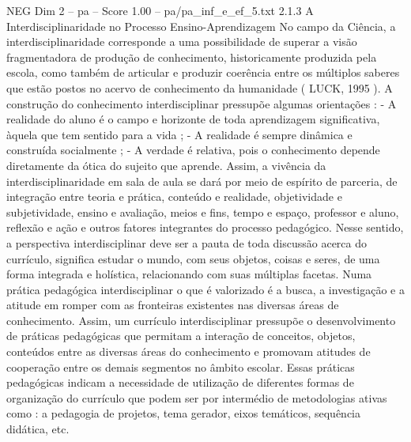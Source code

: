 \begin{textsample}{NEG Dim 2 – pa – Score 1.00 – pa/pa\_inf\_e\_ef\_5.txt}  \label{ex:f2_neg_223}
2.1.3 A Interdisciplinaridade no Processo Ensino-Aprendizagem No campo da Ciência, a interdisciplinaridade corresponde a uma possibilidade de superar a visão fragmentadora de produção de conhecimento, historicamente produzida pela escola, como também de articular e produzir coerência entre os múltiplos saberes que estão postos no acervo de conhecimento da humanidade ( LUCK, 1995 ).
A construção do conhecimento interdisciplinar pressupõe algumas orientações : - A realidade do aluno é o campo e horizonte de toda aprendizagem significativa, àquela que tem sentido para a vida ; - A realidade é sempre dinâmica e construída socialmente ; - A verdade é relativa, pois o conhecimento depende diretamente da ótica do sujeito que aprende.
Assim, a vivência da interdisciplinaridade em sala de aula se dará por meio de espírito de parceria, de integração entre teoria e prática, conteúdo e realidade, objetividade e subjetividade, ensino e avaliação, meios e fins, tempo e espaço, professor e aluno, reflexão e ação e outros fatores integrantes do processo pedagógico.
Nesse sentido, a perspectiva interdisciplinar deve ser a pauta de toda discussão acerca do currículo, significa estudar o mundo, com seus objetos, coisas e seres, de uma forma integrada e holística, relacionando com suas múltiplas facetas.
Numa prática pedagógica interdisciplinar o que é valorizado é a busca, a investigação e a atitude em romper com as fronteiras existentes nas diversas áreas de conhecimento.
Assim, um currículo interdisciplinar pressupõe o desenvolvimento de práticas pedagógicas que permitam a interação de conceitos, objetos, conteúdos entre as diversas áreas do conhecimento e promovam atitudes de cooperação entre os demais segmentos no âmbito escolar.
Essas práticas pedagógicas indicam a necessidade de utilização de diferentes formas de organização do currículo que podem ser por intermédio de metodologias ativas como : a pedagogia de projetos, tema gerador, eixos temáticos, sequência didática, etc.

\end{textsample}
